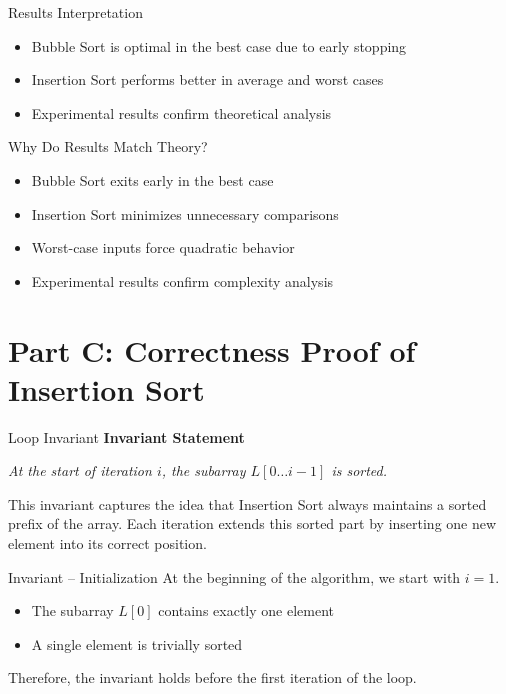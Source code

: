\documentclass[aspectratio=169]{beamer}
\begin{document}
\begin{frame}{Results Interpretation}
\begin{itemize}
    \item<1-> Bubble Sort is optimal in the best case due to early stopping
    \item<2-> Insertion Sort performs better in average and worst cases
    \item<3-> Experimental results confirm theoretical analysis
\end{itemize}
\end{frame}
\begin{frame}{Why Do Results Match Theory?}
\begin{itemize}
    \item<1-> Bubble Sort exits early in the best case
    \item<2-> Insertion Sort minimizes unnecessary comparisons
    \item<3-> Worst-case inputs force quadratic behavior
    \item<4-> Experimental results confirm complexity analysis
\end{itemize}
\end{frame}

\section{Part C: Correctness Proof of Insertion Sort}

\begin{frame}{Loop Invariant}
\textbf{Invariant Statement}

\medskip
\emph{At the start of iteration \(i\), the subarray \(L[0 \ldots i-1]\) is sorted.}

\medskip
This invariant captures the idea that Insertion Sort always maintains a
sorted prefix of the array.  
Each iteration extends this sorted part by inserting one new element
into its correct position.
\end{frame}

\begin{frame}{Invariant – Initialization}
At the beginning of the algorithm, we start with \(i = 1\).

\medskip
\begin{itemize}
  \item<1-> The subarray \(L[0]\) contains exactly one element
  \item<2-> A single element is trivially sorted
\end{itemize}

\medskip
Therefore, the invariant holds before the first iteration of the loop.
\end{frame}
\end{document}
